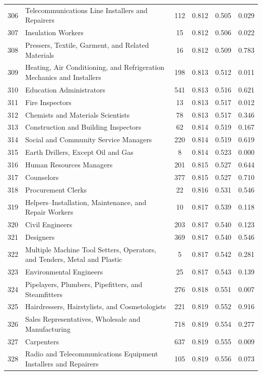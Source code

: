 {\begin{longtable}{llcccc}
 306 & Telecommunications Line Installers and Repairers & 112 & 0.812 & 0.505 & 0.029 \\
 307 & Insulation Workers & 15 & 0.812 & 0.506 & 0.022 \\
 308 & Pressers, Textile, Garment, and Related Materials & 16 & 0.812 & 0.509 & 0.783 \\
 309 & Heating, Air Conditioning, and Refrigeration Mechanics and Installers & 198 & 0.813 & 0.512 & 0.011 \\
 310 & Education Administrators & 541 & 0.813 & 0.516 & 0.621 \\
 311 & Fire Inspectors & 13 & 0.813 & 0.517 & 0.012 \\
 312 & Chemists and Materials Scientists & 78 & 0.813 & 0.517 & 0.346 \\
 313 & Construction and Building Inspectors & 62 & 0.814 & 0.519 & 0.167 \\
 314 & Social and Community Service Managers & 220 & 0.814 & 0.519 & 0.619 \\
 315 & Earth Drillers, Except Oil and Gas & 8 & 0.814 & 0.523 & 0.000 \\
 316 & Human Resources Managers & 201 & 0.815 & 0.527 & 0.644 \\
 317 & Counselors & 377 & 0.815 & 0.527 & 0.710 \\
 318 & Procurement Clerks & 22 & 0.816 & 0.531 & 0.546 \\
 319 & Helpers--Installation, Maintenance, and Repair Workers & 10 & 0.817 & 0.539 & 0.118 \\
 320 & Civil Engineers & 203 & 0.817 & 0.540 & 0.123 \\
 321 & Designers & 369 & 0.817 & 0.540 & 0.546 \\
 322 & Multiple Machine Tool Setters, Operators, and Tenders, Metal and Plastic & 5 & 0.817 & 0.542 & 0.281 \\
 323 & Environmental Engineers & 25 & 0.817 & 0.543 & 0.139 \\
 324 & Pipelayers, Plumbers, Pipefitters, and Steamfitters & 276 & 0.818 & 0.551 & 0.007 \\
 325 & Hairdressers, Hairstylists, and Cosmetologists & 221 & 0.819 & 0.552 & 0.916 \\
 326 & Sales Representatives, Wholesale and Manufacturing & 718 & 0.819 & 0.554 & 0.277 \\
 327 & Carpenters & 637 & 0.819 & 0.555 & 0.009 \\
 328 & Radio and Telecommunications Equipment Installers and Repairers & 105 & 0.819 & 0.556 & 0.073 \\

\end{longtable}}
